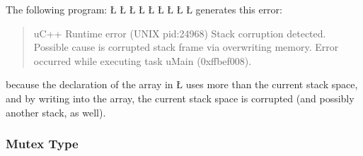 \documentclass[openright,twoside]{report}
\begin{document}
The following program:
\LGinlinefalse\LGbegin\lgrinde
\L{}
\L{\LB{}}
\L{\LB{}}
\CE{}\L{\LB{}}
\L{\LB{}}
\CE{}\L{\LB{}}
\L{\LB{}}
\CE{}\L{\LB{}}
\L{\LB{\}}}
\endlgrinde\LGend
generates this error:
\begin{quote}
\BGfont
uC++ Runtime error (UNIX pid:24968) Stack corruption detected.
Possible cause is corrupted stack frame via overwriting memory.
Error occurred while executing task uMain (0xffbef008).
\end{quote}
because the declaration of the array in \LGinlinetrue\LGbegin\lgrinde\L{}\endlgrinde\LGend{} uses more than the current stack space, and by writing into the array, the current stack space is corrupted (and possibly another stack, as well).


\subsubsection{Mutex Type}
\label{s:MessagesMutexType}
\end{document}
